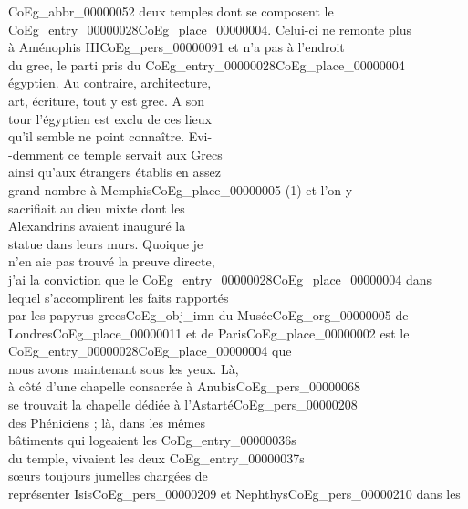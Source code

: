 \documentclass{book}
\begin{document}
{\begin{paracol}{2}
\gls{CoEg_abbr_00000052}
\switchcolumn
\noindent deux temples dont se composent le\\
\Gls{CoEg_entry_00000028}\gls{CoEg_place_00000004}. Celui-ci ne remonte plus\\
à Aménophis III\gls{CoEg_pers_00000091} et n’a pas à l’endroit\\
du grec, le parti pris du \Gls{CoEg_entry_00000028}\gls{CoEg_place_00000004}\\
égyptien. Au contraire, architecture,\\
art, écriture, tout y est grec. A son\\
tour l’égyptien est exclu de ces lieux\\
qu’il semble ne point connaître. Evi-\\
-demment ce temple servait aux Grecs\\
ainsi qu’aux étrangers établis en assez\\
grand nombre à Memphis\gls{CoEg_place_00000005} (1) et l’on y\\
sacrifiait au dieu mixte dont les\\
Alexandrins avaient inauguré la\\
statue dans leurs murs. Quoique je\\
n’en aie pas trouvé la preuve directe,\\
j’ai la conviction que le \Gls{CoEg_entry_00000028}\gls{CoEg_place_00000004} dans\\
lequel s’accomplirent les faits rapportés\\
par les papyrus grecs\gls{CoEg_obj_imn} du Musée\gls{CoEg_org_00000005} de\\
Londres\gls{CoEg_place_00000011} et de Paris\gls{CoEg_place_00000002} est le \Gls{CoEg_entry_00000028}\gls{CoEg_place_00000004} que\\
nous avons maintenant sous les yeux. Là,\\
à côté d’une chapelle consacrée à Anubis\gls{CoEg_pers_00000068}\\
se trouvait la chapelle dédiée à l’Astarté\gls{CoEg_pers_00000208}\\
des Phéniciens ; là, dans les mêmes\\
bâtiments qui logeaient les \glspl{CoEg_entry_00000036}\\
du temple, vivaient les deux \glspl{CoEg_entry_00000037}\\
sœurs toujours jumelles chargées de\\
représenter Isis\gls{CoEg_pers_00000209} et Nephthys\gls{CoEg_pers_00000210} dans les\\

\end{paracol}}
\end{document}
